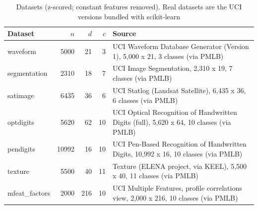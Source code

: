 \begin{table}[t]
\centering
\scriptsize
\setlength{\tabcolsep}{3pt}
\caption{Datasets (z-scored; constant features removed). Real datasets are the UCI versions bundled with scikit-learn}
\label{tab:datasets}
\begin{tabular}{lrrr>{\raggedright\arraybackslash}p{3.3cm}}
\toprule
Dataset & $n$ & $d$ & $c$ & Source \\
\midrule
waveform & 5000 & 21 & 3 & UCI Waveform Database Generator (Version 1), 5,000 x 21, 3 classes (via PMLB) \\
segmentation & 2310 & 18 & 7 & UCI Image Segmentation, 2,310 x 19, 7 classes (via PMLB) \\
satimage & 6435 & 36 & 6 & UCI Statlog (Landsat Satellite), 6,435 x 36, 6 classes (via PMLB) \\
optdigits & 5620 & 62 & 10 & UCI Optical Recognition of Handwritten Digits (full), 5,620 x 64, 10 classes (via PMLB) \\
pendigits & 10992 & 16 & 10 & UCI Pen-Based Recognition of Handwritten Digits, 10,992 x 16, 10 classes (via PMLB) \\
texture & 5500 & 40 & 11 & Texture (ELENA project, via KEEL), 5,500 x 40, 11 classes (via PMLB) \\
mfeat\_factors & 2000 & 216 & 10 & UCI Multiple Features, profile correlations view, 2,000 x 216, 10 classes (via PMLB) \\
\bottomrule
\end{tabular}
\end{table}
